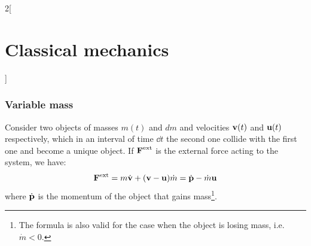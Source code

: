 \documentclass[../../../main.tex]{subfiles}
\begin{document}
\begin{multicols}{2}[\section{Classical mechanics}]
  \subsubsection{Variable mass}
  \begin{prop}
    Consider two objects of masses $m(t)$ and $dm$ and velocities $\boldsymbol{\mathrm{v}}(t)$ and $\boldsymbol{\mathrm{u}}(t)$ respectively, which in an interval of time $\dd t$ the second one collide with the first one and become a unique object. If $\boldsymbol{\mathrm{F}}^\text{ext}$ is the external force acting to the system, we have:
    \begin{equation}
      \boldsymbol{\mathrm{F}}^\text{ext}=m\dot{\boldsymbol{\mathrm{v}}}+(\boldsymbol{\mathrm{v}}-\boldsymbol{\mathrm{u}})\dot{m}=\dot{\boldsymbol{\mathrm{p}}}-\dot{m}\boldsymbol{\mathrm{u}}
      \label{mass}
    \end{equation}
    where $\dot{\boldsymbol{\mathrm{p}}}$ is the momentum of the object that gains mass\footnote{The formula is also valid for the case when the object is losing mass, i.e. $\dot{m}<0$.}.
  \end{prop}

\end{multicols}
\end{document}
